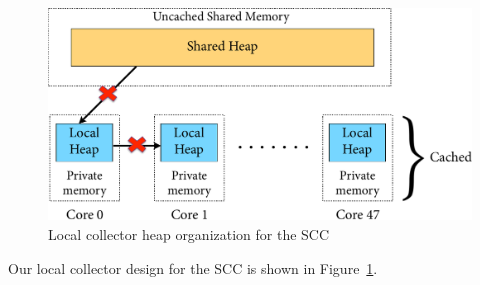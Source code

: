 \begin{figure}
\centering
\includegraphics[scale=0.75]{Figures/LocalCollector.pdf}
\caption{Local collector heap organization for the SCC}
\label{fig:lc}
\end{figure}

Our local collector design for the SCC is shown in Figure~\ref{fig:lc}.
